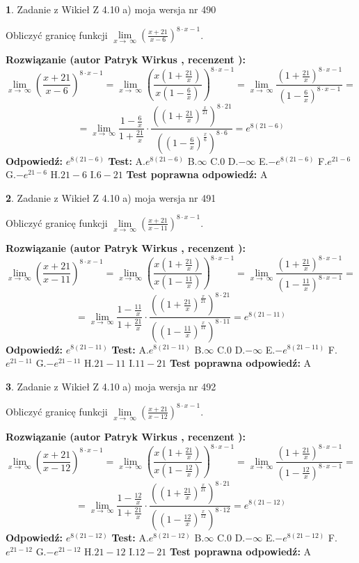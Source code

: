 \documentclass[12pt, a4paper]{article}
\theoremstyle{definition} %
\newtheorem{zad}{}
\newcommand{\zadStart}[1]{\begin{zad}#1\newline}
\newcommand{\zadStop}{\end{zad}}
\newcommand{\rozwStart}[2]{\noindent \textbf{Rozwiązanie (autor #1 , recenzent #2): }\newline}
\newcommand{\rozwStop}{\newline}
\newcommand{\odpStart}{\noindent \textbf{Odpowiedź:}\newline}
\newcommand{\odpStop}{\newline}
\newcommand{\testStart}{\noindent \textbf{Test:}\newline}
\newcommand{\testStop}{\newline}
\newcommand{\kluczStart}{\noindent \textbf{Test poprawna odpowiedź:}\newline}
\newcommand{\kluczStop}{\newline}
\begin{document}
\zadStart{Zadanie z Wikieł Z 4.10 a) moja wersja nr 490}


Obliczyć granicę funkcji  $\lim\limits_{x\to\ \infty}(\frac{x+21}{x-6})^{8\cdot x-1}$.
\zadStop
\rozwStart{Patryk Wirkus}{}
$$\lim\limits_{x\to\ \infty}(\frac{x+21}{x-6})^{8\cdot x-1} = \lim\limits_{x\to\ \infty}(\frac{x(1+\frac{21}{x})}{x(1-\frac{6}{x})})^{8\cdot x-1}=\lim\limits_{x\to\ \infty}\frac{(1+\frac{21}{x})^{8\cdot x-1}}{(1-\frac{6}{x})^{8\cdot x-1}}=$$
$$=\lim\limits_{x\to\ \infty}\frac{1-\frac{6}{x}}{1+\frac{21}{x}}\cdot\frac{((1+\frac{21}{x})^{\frac{x}{21}})^{8\cdot21}}{((1-\frac{6}{x})^{\frac{x}{6}})^{8\cdot6}}=e^{8(21-6)}$$
\rozwStop
\odpStart
$e^{8(21-6)}$
\odpStop
\testStart
A.$e^{8(21-6)}$ B.$\infty$ C.$0$ D.$-\infty$ E.$-e^{8(21-6)}$
F.$e^{21-6}$ G.$-e^{21-6}$
H.$21-6$
I.$6-21$
\testStop
\kluczStart
A
\kluczStop



\zadStart{Zadanie z Wikieł Z 4.10 a) moja wersja nr 491}


Obliczyć granicę funkcji  $\lim\limits_{x\to\ \infty}(\frac{x+21}{x-11})^{8\cdot x-1}$.
\zadStop
\rozwStart{Patryk Wirkus}{}
$$\lim\limits_{x\to\ \infty}(\frac{x+21}{x-11})^{8\cdot x-1} = \lim\limits_{x\to\ \infty}(\frac{x(1+\frac{21}{x})}{x(1-\frac{11}{x})})^{8\cdot x-1}=\lim\limits_{x\to\ \infty}\frac{(1+\frac{21}{x})^{8\cdot x-1}}{(1-\frac{11}{x})^{8\cdot x-1}}=$$
$$=\lim\limits_{x\to\ \infty}\frac{1-\frac{11}{x}}{1+\frac{21}{x}}\cdot\frac{((1+\frac{21}{x})^{\frac{x}{21}})^{8\cdot21}}{((1-\frac{11}{x})^{\frac{x}{11}})^{8\cdot11}}=e^{8(21-11)}$$
\rozwStop
\odpStart
$e^{8(21-11)}$
\odpStop
\testStart
A.$e^{8(21-11)}$ B.$\infty$ C.$0$ D.$-\infty$ E.$-e^{8(21-11)}$
F.$e^{21-11}$ G.$-e^{21-11}$
H.$21-11$
I.$11-21$
\testStop
\kluczStart
A
\kluczStop



\zadStart{Zadanie z Wikieł Z 4.10 a) moja wersja nr 492}


Obliczyć granicę funkcji  $\lim\limits_{x\to\ \infty}(\frac{x+21}{x-12})^{8\cdot x-1}$.
\zadStop
\rozwStart{Patryk Wirkus}{}
$$\lim\limits_{x\to\ \infty}(\frac{x+21}{x-12})^{8\cdot x-1} = \lim\limits_{x\to\ \infty}(\frac{x(1+\frac{21}{x})}{x(1-\frac{12}{x})})^{8\cdot x-1}=\lim\limits_{x\to\ \infty}\frac{(1+\frac{21}{x})^{8\cdot x-1}}{(1-\frac{12}{x})^{8\cdot x-1}}=$$
$$=\lim\limits_{x\to\ \infty}\frac{1-\frac{12}{x}}{1+\frac{21}{x}}\cdot\frac{((1+\frac{21}{x})^{\frac{x}{21}})^{8\cdot21}}{((1-\frac{12}{x})^{\frac{x}{12}})^{8\cdot12}}=e^{8(21-12)}$$
\rozwStop
\odpStart
$e^{8(21-12)}$
\odpStop
\testStart
A.$e^{8(21-12)}$ B.$\infty$ C.$0$ D.$-\infty$ E.$-e^{8(21-12)}$
F.$e^{21-12}$ G.$-e^{21-12}$
H.$21-12$
I.$12-21$
\testStop
\kluczStart
A
\kluczStop
\end{document}
